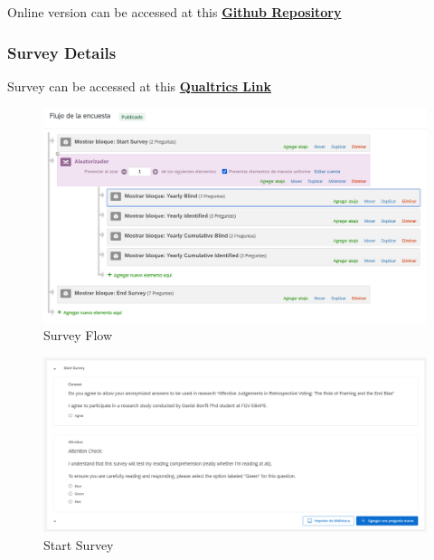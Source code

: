 \documentclass[
]{article}
\begin{document}
Online version can be accessed at this
\href{https://danybonfil.github.io/start/}{\textbf{Github Repository}}

\hypertarget{survey-details}{%
\subsubsection{Survey Details}\label{survey-details}}

Survey can be accessed at this
\href{https://survey.fgv.br/jfe/form/SV_5jUiMOHHgM1t0DY}{\textbf{Qualtrics
Link}}

\begin{figure}
\hypertarget{fig:label}{%
\centering
\includegraphics[width=1\textwidth,height=1\textheight]{flow_survey.png}
\caption{Survey Flow}\label{fig:label}
}
\end{figure}

\begin{figure}
\hypertarget{fig:label}{%
\centering
\includegraphics[width=1\textwidth,height=1\textheight]{start_survey.png}
\caption{Start Survey}\label{fig:label}
}
\end{figure}
\end{document}
